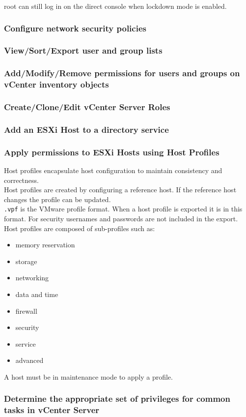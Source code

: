 root can still log in on the direct console when lockdown mode is enabled.

\subsubsection{Configure network security policies}

\subsubsection{View/Sort/Export user and group lists}

\subsubsection{Add/Modify/Remove permissions for users and groups on vCenter inventory objects}

\subsubsection{Create/Clone/Edit vCenter Server Roles}

\subsubsection{Add an ESXi Host to a directory service}

\subsubsection{Apply permissions to ESXi Hosts using Host Profiles}

Host profiles encapsulate host configuration to maintain consistency and
correctness.\\

Host profiles are created by configuring a reference host. If the reference
host changes the profile can be updated.\\

\texttt{.vpf} is the VMware profile format. When a host profile is exported
it is in this format. For security usernames and passwords are not included
in the export.\\

Host profiles are composed of sub-profiles such as:

\begin{itemize}
\item memory reservation
\item storage
\item networking
\item data and time
\item firewall
\item security
\item service
\item advanced
\end{itemize}

A host must be in maintenance mode to apply a profile.

\subsubsection{Determine the appropriate set of privileges for common tasks in vCenter Server}
